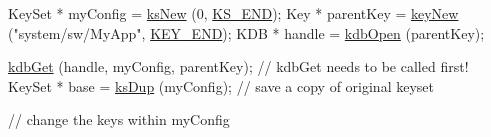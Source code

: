 \begin{DoxyCodeInclude}
KeySet * myConfig = \hyperlink{group__keyset_ga671e1aaee3ae9dc13b4834a4ddbd2c3c}{ksNew} (0, \hyperlink{kdbenum_8c_a7a28fce3773b2c873c94ac80b8b4cd54}{KS\_END});
Key * parentKey = \hyperlink{group__key_gad23c65b44bf48d773759e1f9a4d43b89}{keyNew} (\textcolor{stringliteral}{"system/sw/MyApp"}, \hyperlink{group__key_gga91fb3178848bd682000958089abbaf40aa8adb6fcb92dec58fb19410eacfdd403}{KEY\_END});
KDB * handle = \hyperlink{group__kdb_ga6808defe5870f328dd17910aacbdc6ca}{kdbOpen} (parentKey);

\hyperlink{group__kdb_ga28e385fd9cb7ccfe0b2f1ed2f62453a1}{kdbGet} (handle, myConfig, parentKey); \textcolor{comment}{// kdbGet needs to be called first!}
KeySet * base = \hyperlink{group__keyset_gac59e4b328245463f1451f68d5106151c}{ksDup} (myConfig);     \textcolor{comment}{// save a copy of original keyset}

\textcolor{comment}{// change the keys within myConfig}


\end{DoxyCodeInclude}
